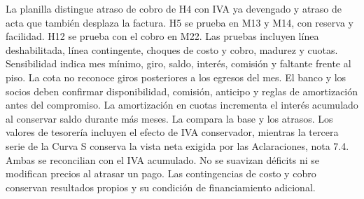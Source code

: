 La planilla distingue atraso de cobro de H4 con IVA ya devengado y atraso de acta que también desplaza la factura. H5 se prueba en M13 y M14, con reserva y facilidad. H12 se prueba con el cobro en M22. Las pruebas incluyen línea deshabilitada, línea contingente, choques de costo y cobro, madurez y cuotas. Sensibilidad indica mes mínimo, giro, saldo, interés, comisión y faltante frente al piso. La cota no reconoce giros posteriores a los egresos del mes. El banco y los socios deben confirmar disponibilidad, comisión, anticipo y reglas de amortización antes del compromiso. La amortización en cuotas incrementa el interés acumulado al conservar saldo durante más meses.
La  compara la base y los atrasos. Los valores de tesorería incluyen el efecto de IVA conservador, mientras la tercera serie de la Curva S conserva la vista neta exigida por las Aclaraciones, nota 7.4. Ambas se reconcilian con el IVA acumulado.
No se suavizan déficits ni se modifican precios al atrasar un pago. Las contingencias de costo y cobro conservan resultados propios y su condición de financiamiento adicional.

